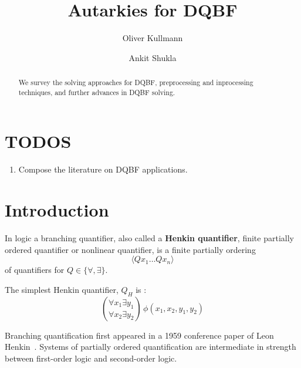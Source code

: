 \documentclass[runningheads]{llncs}
\begin{document}
\title{Autarkies for DQBF}

\author{Oliver Kullmann \and Ankit Shukla}


\maketitle

\begin{abstract}
We survey the solving approaches for DQBF, preprocessing and inprocessing techniques, and further advances in DQBF solving.
\end{abstract}


\setcounter{section}{-1}
\section{TODOS}
\label{sec:todos}

\begin{enumerate}
\item Compose the literature on DQBF applications.
\end{enumerate}


\section{Introduction}
\label{sec:intro}

In logic a branching quantifier, also called a \textbf{Henkin quantifier}, finite partially ordered quantifier or nonlinear quantifier, is a finite partially ordering
\[ \langle Qx_{1}\dots Qx_{n}\rangle \]
of quantifiers for $Q  \in \{\forall,\exists\}$.

The simplest Henkin quantifier, $Q_{H}$ is :
\begin{displaymath}
\binom{\forall x_{1} \exists y_{1}}{\forall x_{2} \exists y_{2}} \, \phi(x_{1},x_{2},y_{1},y_{2})
\end{displaymath}

Branching quantification first appeared in a 1959 conference paper of Leon Henkin~\cite{henkin1961some}.
Systems of partially ordered quantification are intermediate in strength between first-order logic and second-order logic.
\end{document}
